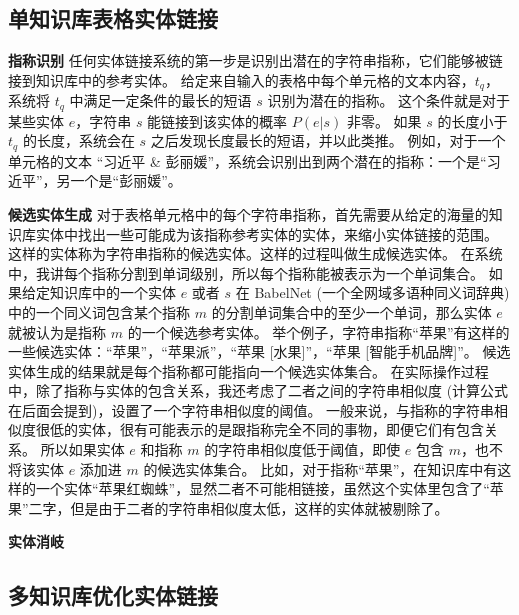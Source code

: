 \subsection{单知识库表格实体链接}

\noindent\textbf{指称识别}\newline
任何实体链接系统的第一步是识别出潜在的字符串指称，它们能够被链接到知识库中的参考实体。
给定来自输入的表格中每个单元格的文本内容，$t_q$，系统将 $t_q$ 中满足一定条件的最长的短语 $s$ 识别为潜在的指称。
这个条件就是对于某些实体 $e$，字符串 $s$ 能链接到该实体的概率 $P(e|s)$ 非零。
如果 $s$ 的长度小于 $t_q$ 的长度，系统会在 $s$ 之后发现长度最长的短语，并以此类推。
例如，对于一个单元格的文本 ``习近平 \& 彭丽媛''，系统会识别出到两个潜在的指称：一个是``习近平''，另一个是``彭丽媛''。\newline


\noindent\textbf{候选实体生成}\newline
对于表格单元格中的每个字符串指称，首先需要从给定的海量的知识库实体中找出一些可能成为该指称参考实体的实体，来缩小实体链接的范围。
这样的实体称为字符串指称的候选实体。这样的过程叫做生成候选实体。
在系统中，我讲每个指称分割到单词级别，所以每个指称能被表示为一个单词集合。
如果给定知识库中的一个实体 $e$ 或者 $s$ 在 BabelNet\cite{navigli2010babelnet} (一个全网域多语种同义词辞典) 中的一个同义词包含某个指称 $m$ 的分割单词集合中的至少一个单词，那么实体 $e$ 就被认为是指称 $m$ 的一个候选参考实体。
举个例子，字符串指称``苹果''有这样的一些候选实体：``苹果''，``苹果派''，``苹果 [水果]''，``苹果 [智能手机品牌]''。
候选实体生成的结果就是每个指称都可能指向一个候选实体集合。
在实际操作过程中，除了指称与实体的包含关系，我还考虑了二者之间的字符串相似度 (计算公式在后面会提到)，设置了一个字符串相似度的阈值。
一般来说，与指称的字符串相似度很低的实体，很有可能表示的是跟指称完全不同的事物，即便它们有包含关系。
所以如果实体 $e$ 和指称 $m$ 的字符串相似度低于阈值，即使 $e$ 包含 $m$，也不将该实体 $e$ 添加进 $m$ 的候选实体集合。
比如，对于指称``苹果''，在知识库中有这样的一个实体``苹果红蜘蛛''，显然二者不可能相链接，虽然这个实体里包含了``苹果''二字，但是由于二者的字符串相似度太低，这样的实体就被剔除了。\newline

\noindent\textbf{实体消岐}\newline







\subsection{多知识库优化实体链接}

